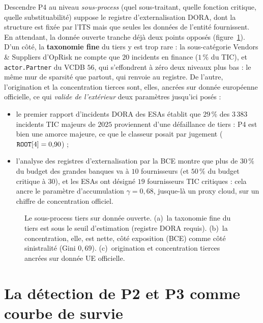 Descendre P4 au niveau \emph{sous-process} (quel sous-traitant, quelle fonction critique, quelle
substituabilité) suppose le registre d'externalisation DORA, dont la structure est fixée par
l'ITS \citep{eu2024_2956} mais que seules les données de l'entité fournissent. En attendant, la
donnée ouverte tranche déjà deux points opposés (figure~\ref{fig:p4-open}). D'un côté, la
\textbf{taxonomie fine} du tiers y est trop rare : la sous-catégorie \og Vendors \& Suppliers \fg{}
d'OpRisk ne compte que $20$ incidents en finance ($1\,\%$ du TIC), et \texttt{actor.Partner} du
VCDB $56$, qui s'effondrent à zéro deux niveaux plus bas : le même mur de sparsité que partout,
qui renvoie au registre. De l'autre, l'origination et la concentration tierces
sont, elles, ancrées sur donnée européenne officielle, ce qui \emph{valide de l'extérieur} deux
paramètres jusqu'ici posés :
\begin{itemize}\itemsep2pt
\item le premier rapport d'incidents DORA des ESAs \citep{esas2026_incidents} établit que
      $29\,\%$ des $3\,383$ incidents TIC majeurs de $2025$ proviennent d'une
      défaillance de tiers : P4 est bien une amorce majeure, ce que le classeur posait
      par jugement ($\text{\texttt{ROOT}}[4]=0{,}90$) ;
\item l'analyse des registres d'externalisation par la BCE \citep{ecb2024_outsourcing} montre que
      plus de $30\,\%$ du budget des grandes banques va à $10$ fournisseurs (et $50\,\%$ du budget
      critique à $30$), et les ESAs ont désigné $19$ fournisseurs TIC critiques : cela
      ancre le paramètre d'accumulation $\gamma=0{,}68$, jusque-là un proxy cloud, sur un
      chiffre de concentration officiel.
\end{itemize}

\begin{figure}[htbp]\centering
{}
\caption{Le sous-process tiers sur donnée ouverte. (a)~la taxonomie fine du tiers est sous le
seuil d'estimation (registre DORA requis). (b)~la concentration, elle, est nette, côté exposition
(BCE) comme côté sinistralité (Gini $0{,}69$). (c)~origination et
concentration tierces ancrées sur donnée UE officielle.}
\label{fig:p4-open}
\end{figure}

\section{La détection de P2 et P3 comme courbe de survie}
\label{sec:detection}

